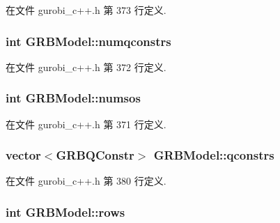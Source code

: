 在文件 gurobi\+\_\+c++.\+h 第 373 行定义.

\subsubsection[{\texorpdfstring{numqconstrs}{numqconstrs}}]{\setlength{\rightskip}{0pt plus 5cm}int G\+R\+B\+Model\+::numqconstrs\hspace{0.3cm}{\ttfamily [private]}}\hypertarget{classGRBModel_aad59ddf2475017a4828a22e08e52b59a}{}\label{classGRBModel_aad59ddf2475017a4828a22e08e52b59a}


在文件 gurobi\+\_\+c++.\+h 第 372 行定义.

\subsubsection[{\texorpdfstring{numsos}{numsos}}]{\setlength{\rightskip}{0pt plus 5cm}int G\+R\+B\+Model\+::numsos\hspace{0.3cm}{\ttfamily [private]}}\hypertarget{classGRBModel_a0743eafebda885b7df2c2b5923f6b8b1}{}\label{classGRBModel_a0743eafebda885b7df2c2b5923f6b8b1}


在文件 gurobi\+\_\+c++.\+h 第 371 行定义.

\subsubsection[{\texorpdfstring{qconstrs}{qconstrs}}]{\setlength{\rightskip}{0pt plus 5cm}vector$<${\bf G\+R\+B\+Q\+Constr}$>$ G\+R\+B\+Model\+::qconstrs\hspace{0.3cm}{\ttfamily [private]}}\hypertarget{classGRBModel_ab999e528d40409141a1db990e6277806}{}\label{classGRBModel_ab999e528d40409141a1db990e6277806}


在文件 gurobi\+\_\+c++.\+h 第 380 行定义.

\subsubsection[{\texorpdfstring{rows}{rows}}]{\setlength{\rightskip}{0pt plus 5cm}int G\+R\+B\+Model\+::rows\hspace{0.3cm}{\ttfamily [private]}}\hypertarget{classGRBModel_ada5c8e80ac12d437788ccad6c1f42b24}{}\label{classGRBModel_ada5c8e80ac12d437788ccad6c1f42b24}


